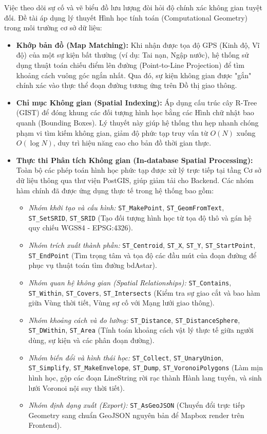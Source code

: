 
Việc theo dõi sự cố và vẽ biểu đồ lưu lượng đòi hỏi độ chính xác không gian tuyệt đối. Đề tài áp dụng lý thuyết Hình học tính toán (Computational Geometry) trong môi trường cơ sở dữ liệu:
\begin{itemize}
    \item \textbf{Khớp bản đồ (Map Matching):} Khi nhận được tọa độ GPS (Kinh độ, Vĩ độ) của một sự kiện bất thường (ví dụ: Tai nạn, Ngập nước), hệ thống sử dụng thuật toán chiếu điểm lên đường (Point-to-Line Projection) để tìm khoảng cách vuông góc ngắn nhất. Qua đó, sự kiện không gian được "gắn" chính xác vào thực thể đoạn đường tương ứng trên Đồ thị giao thông.
    \item \textbf{Chỉ mục Không gian (Spatial Indexing):} Áp dụng cấu trúc cây R-Tree (GIST) để đóng khung các đối tượng hình học bằng các Hình chữ nhật bao quanh (Bounding Boxes). Lý thuyết này giúp hệ thống thu hẹp nhanh chóng phạm vi tìm kiếm không gian, giảm độ phức tạp truy vấn từ $O(N)$ xuống $O(\log N)$, duy trì hiệu năng cao cho bản đồ thời gian thực.
    \item \textbf{Thực thi Phân tích Không gian (In-database Spatial Processing):} Toàn bộ các phép toán hình học phức tạp được xử lý trực tiếp tại tầng Cơ sở dữ liệu thông qua thư viện PostGIS, giúp giảm tải cho Backend. Các nhóm hàm chính đã được ứng dụng thực tế trong hệ thống bao gồm:
    \begin{itemize}
        \item \textit{Nhóm khởi tạo và cấu hình:} \texttt{ST\_MakePoint}, \texttt{ST\_GeomFromText}, \texttt{ST\_SetSRID}, \texttt{ST\_SRID} (Tạo đối tượng hình học từ tọa độ thô và gán hệ quy chiếu WGS84 - EPSG:4326).
        \item \textit{Nhóm trích xuất thành phần:} \texttt{ST\_Centroid}, \texttt{ST\_X}, \texttt{ST\_Y}, \texttt{ST\_StartPoint}, \texttt{ST\_EndPoint} (Tìm trọng tâm và tọa độ các đầu mút của đoạn đường để phục vụ thuật toán tìm đường bdAstar).
        \item \textit{Nhóm quan hệ không gian (Spatial Relationships):} \texttt{ST\_Contains}, \texttt{ST\_Within}, \texttt{ST\_Covers}, \texttt{ST\_Intersects} (Kiểm tra sự giao cắt và bao hàm giữa Vùng thời tiết, Vùng sự cố với Mạng lưới giao thông).
        \item \textit{Nhóm khoảng cách và đo lường:} \texttt{ST\_Distance}, \texttt{ST\_DistanceSphere}, \texttt{ST\_DWithin}, \texttt{ST\_Area} (Tính toán khoảng cách vật lý thực tế giữa người dùng, sự kiện và các phân đoạn đường).
        \item \textit{Nhóm biến đổi và hình thái học:} \texttt{ST\_Collect}, \texttt{ST\_UnaryUnion}, \texttt{ST\_Simplify}, \texttt{ST\_MakeEnvelope}, \texttt{ST\_Dump}, \texttt{ST\_VoronoiPolygons} (Làm mịn hình học, gộp các đoạn LineString rời rạc thành Hành lang tuyến, và sinh lưới Voronoi nội suy thời tiết).
        \item \textit{Nhóm định dạng xuất (Export):} \texttt{ST\_AsGeoJSON} (Chuyển đổi trực tiếp Geometry sang chuẩn GeoJSON nguyên bản để Mapbox render trên Frontend).
    \end{itemize}
\end{itemize}

